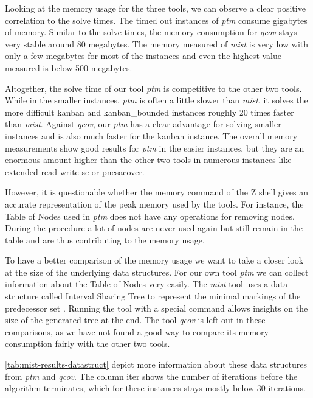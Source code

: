 Looking at the memory usage for the three tools, we can observe a clear positive correlation to the solve times. The timed out instances of \textit{ptm} consume gigabytes of memory. Similar to the solve times, the memory consumption for \textit{qcov} stays very stable around 80 megabytes. The memory measured of \textit{mist} is very low with only a few megabytes for most of the instances and even the highest value measured is below 500 megabytes.

Altogether, the solve time of our tool \textit{ptm} is competitive to the other two tools. While in the smaller instances, \textit{ptm} is often a little slower than \textit{mist}, it solves the more difficult kanban and kanban\_bounded instances roughly 20 times faster than \textit{mist}.
Against \textit{qcov}, our \textit{ptm} has a clear advantage for solving smaller instances and is also much faster for the kanban instance.
The overall memory measurements show good results for \textit{ptm} in the easier instances, but they are an enormous amount higher than the other two tools in numerous instances like extended-read-write-sc or pncsacover.

\bigbreak

However, it is questionable whether the memory command of the Z shell gives an accurate representation of the peak memory used by the tools. For instance, the Table of Nodes used in \textit{ptm} does not have any operations for removing nodes. During the procedure a lot of nodes are never used again but still remain in the table and are thus contributing to the memory usage.

To have a better comparison of the memory usage we want to take a closer look at the size of the underlying data structures. For our own tool \textit{ptm} we can collect information about the Table of Nodes very easily. The \textit{mist} tool uses a data structure called Interval Sharing Tree to represent the minimal markings of the predecessor set \cite{ganty_07,ganty_15}. Running the tool with a special command allows insights on the size of the generated tree at the end. 
The tool \textit{qcov} is left out in these comparisons, as we have not found a good way to compare its memory consumption fairly with the other two tools. 
\bigbreak

\autoref{tab:mist-results-datastruct} depict more information about these data structures from \textit{ptm} and \textit{qcov}.
The column iter shows the number of iterations before the algorithm terminates, which for these instances stays mostly below 30 iterations.

